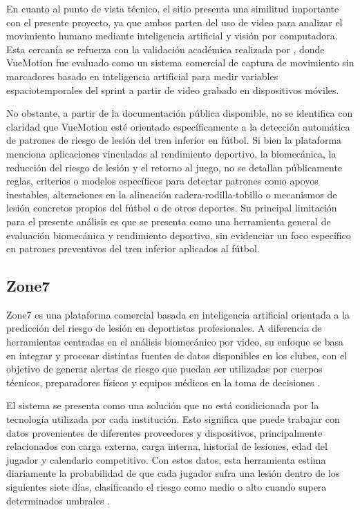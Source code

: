En cuanto al punto de vista técnico, el sitio presenta una similitud importante con el
presente proyecto, ya que ambos parten del uso de video para analizar el movimiento humano
mediante inteligencia artificial y visión por computadora. Esta cercanía se refuerza con la
validación académica realizada por \textcite{DennisonEtAl2026}, donde VueMotion fue
evaluado como un sistema comercial de captura de movimiento sin marcadores basado en
inteligencia artificial para medir variables espaciotemporales del sprint a partir de video
grabado en dispositivos móviles.

No obstante, a partir de la documentación pública disponible, no se identifica con claridad
que VueMotion esté orientado específicamente a la detección automática de patrones de riesgo
de lesión del tren inferior en fútbol. Si bien la plataforma menciona aplicaciones vinculadas
al rendimiento deportivo, la biomecánica, la reducción del riesgo de lesión y el retorno al
juego, no se detallan públicamente reglas, criterios o modelos específicos para detectar
patrones como apoyos inestables, alteraciones en la alineación cadera-rodilla-tobillo o
mecanismos de lesión concretos propios del fútbol o de otros deportes. Su principal
limitación para el presente análisis es que se presenta como una herramienta general de
evaluación biomecánica y rendimiento deportivo, sin evidenciar un foco específico en
patrones preventivos del tren inferior aplicados al fútbol.

\subsection{Zone7}

Zone7 \parencite{Zone7ValidationStudy} es una plataforma comercial basada en inteligencia
artificial orientada a la predicción del riesgo de lesión en deportistas profesionales. A
diferencia de herramientas centradas en el análisis biomecánico por video, su enfoque se
basa en integrar y procesar distintas fuentes de datos disponibles en los clubes, con el
objetivo de generar alertas de riesgo que puedan ser utilizadas por cuerpos técnicos,
preparadores físicos y equipos médicos en la toma de decisiones \parencite{SportsmithZone7}.

El sistema se presenta como una solución que no está condicionada por la tecnología
utilizada por cada institución. Esto significa que puede trabajar con datos provenientes de
diferentes proveedores y dispositivos, principalmente relacionados con carga externa, carga
interna, historial de lesiones, edad del jugador y calendario competitivo. Con estos datos,
esta herramienta estima diariamente la probabilidad de que cada jugador sufra una lesión
dentro de los siguientes siete días, clasificando el riesgo como medio o alto cuando supera
determinados umbrales \parencite{Zone7ValidationStudy}.

